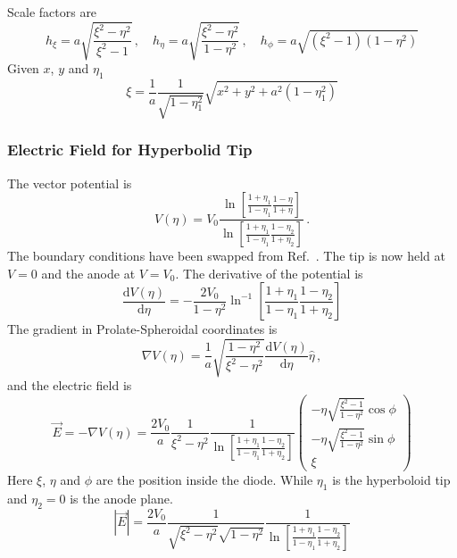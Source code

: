 \documentclass[a4paper,10pt]{article}
\numberwithin{equation}{section}
\newcommand{\ud}{\mathrm{d}}
\begin{document}
  Scale factors are
  \begin{equation}
    h_{\xi} = a \sqrt{ \frac{\xi^2-\eta^2}{\xi^2-1} }\,, \quad
    h_{\eta} = a \sqrt{ \frac{\xi^2-\eta^2}{1-\eta^2} }\,, \quad
    h_{\phi} = a \sqrt{ (\xi^2-1)(1-\eta^2) }
  \end{equation}
%
  Given \(x\), \(y\) and \(\eta_1\)
  \begin{equation}
   \xi = \frac{1}{a} \frac{1}{\sqrt{1-\eta_1^2}} \sqrt{x^2 + y^2 + a^2(1-\eta_1^2)}
  \end{equation}
%
%
\subsubsection{Electric Field for Hyperbolid Tip}
  The vector potential is~\cite{pan:2151}
  \begin{equation}
    V(\eta) = V_0 \frac{\ln{\left[ \frac{1 + \eta_1}{1-\eta_1}\frac{1-\eta}{1+\eta} \right]}}{\ln{\left[ \frac{1+\eta_1}{1-\eta_1}\frac{1-\eta_2}{1+\eta_2} \right]}}\, .
  \end{equation}
  The boundary conditions have been swapped from Ref.~\parencite{pan:2151}. The tip is now held at \(V = 0\) and the anode at \(V = V_0\).
  The derivative of the potential is
  \begin{equation}
    \frac{\ud V(\eta)}{\ud \eta} = -\frac{2V_0}{1-\eta^2} \ln^{-1} \left[ \frac{1+\eta_1}{1-\eta_1} \frac{1-\eta_2}{1+\eta_2} \right]
  \end{equation}
  The gradient in Prolate-Spheroidal coordinates is
  \begin{equation}
    \nabla V(\eta) = \frac{1}{a} \sqrt{\frac{1-\eta^2}{\xi^2-\eta^2}} \frac{\ud V(\eta)}{\ud \eta} \hat{\eta}\, ,
  \end{equation}
  and the electric field is
  \begin{equation}
   \vec{E} = - \nabla V(\eta) = \frac{2V_0}{a} \frac{1}{\xi^2-\eta^2} \frac{1}{\ln \left[ \frac{1+\eta_1}{1-\eta_1} \frac{1-\eta_2}{1+\eta_2} \right]}
                                \begin{pmatrix}
                                  -\eta \sqrt{\frac{\xi^2-1}{1-\eta^2}} \cos{\phi}\\
                                  -\eta \sqrt{\frac{\xi^2-1}{1-\eta^2}} \sin{\phi}\\
                                  \xi
                                \end{pmatrix}
  \end{equation}
  Here \(\xi\), \(\eta\) and \(\phi\) are the position inside the diode. While \(\eta_1\) is the hyperboloid tip and \(\eta_2 = 0\) is the anode plane.
  \begin{equation}
    |\vec{E}| = \frac{2V_0}{a} \frac{1}{\sqrt{\xi^2-\eta^2}\sqrt{1-\eta^2}} \frac{1}{\ln \left[ \frac{1+\eta_1}{1-\eta_1} \frac{1-\eta_2}{1+\eta_2} \right]}
  \end{equation}
\end{document}
